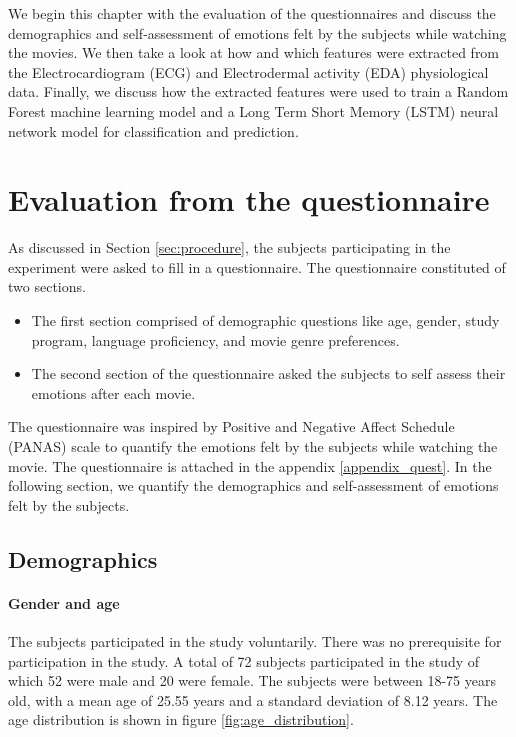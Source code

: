 We begin this chapter with the evaluation of the questionnaires and discuss the demographics and self-assessment of emotions felt by the subjects while watching the movies. We then take a look at how and which features were extracted from the Electrocardiogram (ECG) and Electrodermal activity (EDA) physiological data. Finally, we discuss how the extracted features were used to train a Random Forest machine learning model and a Long Term Short Memory (LSTM) \cite{lstm_hochreiter} neural network model for classification and prediction.

\section{Evaluation from the questionnaire}
As discussed in Section \ref{sec:procedure}, the subjects participating in the experiment were asked to fill in a questionnaire. The questionnaire constituted of two sections.
\begin{itemize}
    \item The first section comprised of demographic questions like age, gender, study program, language proficiency, and movie genre preferences.
    \item The second section of the questionnaire asked the subjects to self assess their emotions after each movie.
\end{itemize} 
The questionnaire was inspired by Positive and Negative Affect Schedule (PANAS) scale\cite{panas_crocker:1997} to quantify the emotions felt by the subjects while watching the movie. The questionnaire is attached in the appendix \ref{appendix_quest}. In the following section, we quantify the demographics and self-assessment of emotions felt by the subjects.
\subsection{Demographics}
\paragraph{Gender and age} The subjects participated in the study voluntarily. There was no prerequisite for participation in the study. A total of 72 subjects participated in the study of which 52 were male and 20 were female. The subjects were between 18-75 years old, with a mean age of 25.55 years and a standard deviation of 8.12 years. The age distribution is shown in figure \ref{fig:age_distribution}.

